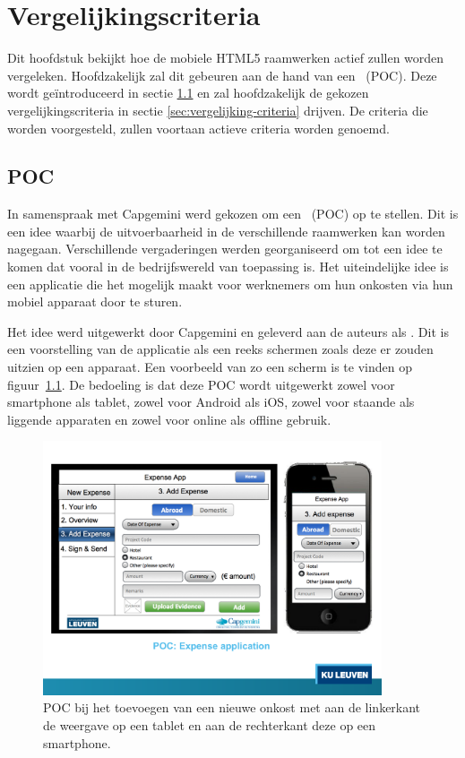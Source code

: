 
\chapter{Vergelijkingscriteria}
\label{chap:vergelijkingscriteria}

Dit hoofdstuk bekijkt hoe de mobiele HTML5 raamwerken actief zullen worden vergeleken.
Hoofdzakelijk zal dit gebeuren aan de hand van een ~(POC).
Deze wordt geïntroduceerd in sectie \ref{sec:vergelijking-poc} en zal hoofdzakelijk de gekozen vergelijkingscriteria in sectie \ref{sec:vergelijking-criteria} drijven.
De criteria die worden voorgesteld, zullen voortaan actieve criteria worden genoemd.


\section{POC}
\label{sec:vergelijking-poc}
In samenspraak met Capgemini werd gekozen om een ~(POC) op te stellen.
Dit is een idee waarbij de uitvoerbaarheid in de verschillende raamwerken kan worden nagegaan.
Verschillende vergaderingen werden georganiseerd om tot een idee te komen dat vooral in de bedrijfswereld van toepassing is.
Het uiteindelijke idee is een applicatie die het mogelijk maakt voor werknemers om hun onkosten via hun mobiel apparaat door te sturen.

Het idee werd uitgewerkt door Capgemini en geleverd aan de auteurs als .
Dit is een voorstelling van de applicatie als een reeks schermen zoals deze er zouden uitzien op een apparaat. 
Een voorbeeld van zo een scherm is te vinden op figuur~\ref{fig:poc}. 
De bedoeling is dat deze POC wordt uitgewerkt zowel voor smartphone als tablet, zowel voor Android als iOS, zowel voor staande als liggende apparaten en zowel voor online als offline gebruik.

\begin{figure}
  \centering
  \includegraphics[trim=0cm 4cm 0cm 1.25cm,clip=true,height=7.5cm]{figuren/poc.pdf}
  \caption{POC bij het toevoegen van een nieuwe onkost met aan de linkerkant de weergave op een tablet en aan de rechterkant deze op een smartphone.}
  \label{fig:poc}
\end{figure}

